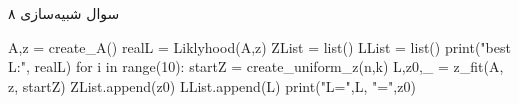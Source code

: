 سوال شبیه‌سازی ۸

\begin{latin}
\begin{python}
A,z = create_A()
realL = Liklyhood(A,z)
ZList = list()
LList = list()
print("best L:", realL)
for i in range(10):
    startZ = create_uniform_z(n,k)
    L,z0,_ = z_fit(A, z, startZ)
    ZList.append(z0)
    LList.append(L)
    print("L=",L, "\tZ=",z0)
\end{python}
\end{latin}